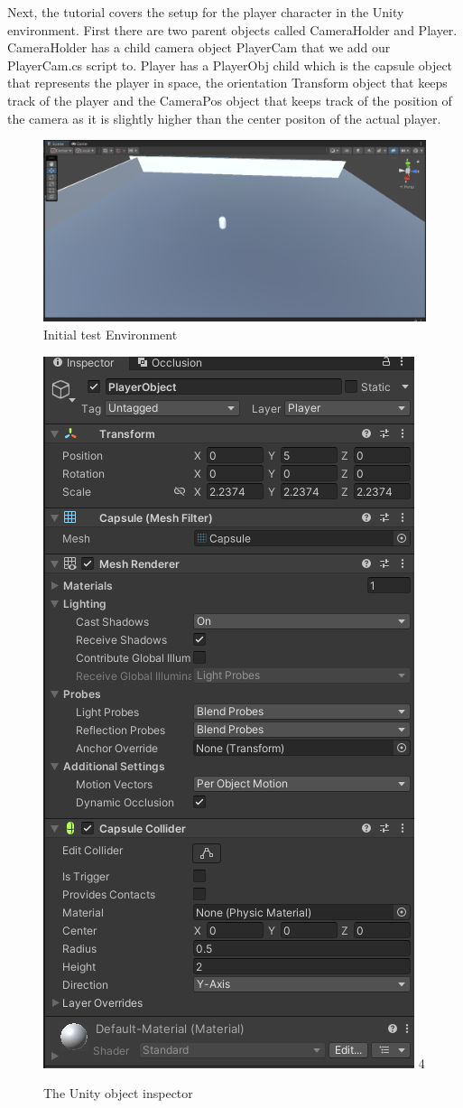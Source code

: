 \documentclass[10pt,twocolumn]{article}
\begin{document}
Next, the tutorial covers the setup for the player character in the Unity environment. First there are two parent objects called CameraHolder and Player. CameraHolder has a child camera object PlayerCam that we add our PlayerCam.cs script to. Player has a PlayerObj child which is the capsule object that represents the player in space, the orientation Transform object that keeps track of the player and the CameraPos object that keeps track of the position of the camera as it is slightly higher than the center positon of the actual player.
\begin{figure}
    \centering
    \includegraphics[width=.95\linewidth]{capsuleEnvironment.png}
    \caption{
        Initial test Environment
    }
    \label{figure 1}
\end{figure}
\begin{figure}
    \centering
    \includegraphics[width=.5\linewidth]{UnityInspector.png}
4    \caption{
        The Unity object inspector
    }
    \label{figure 2}
\end{figure}
\end{document}
